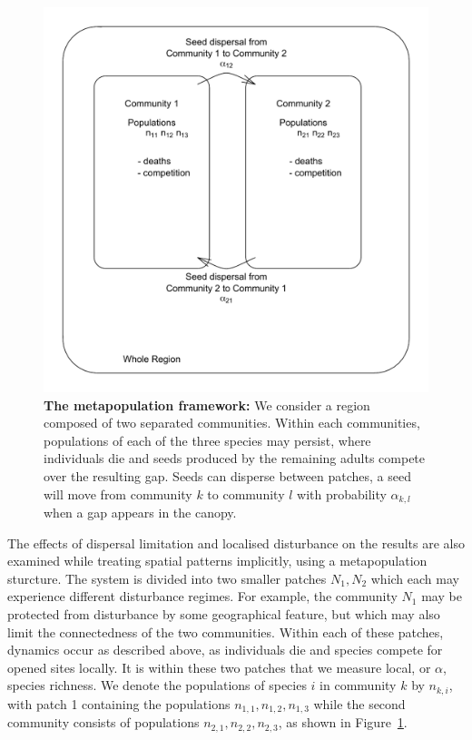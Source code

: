 \begin{figure}[htbp]
\begin{center}
\includegraphics[width=4.5in]{schematic.pdf}
\caption[The metapopulation framework]{\textbf{The metapopulation framework:} We consider a region composed of two separated communities. Within each communities, populations of each of the three species may persist, where individuals die and seeds produced by the remaining adults compete over the resulting gap. Seeds can disperse between patches, a seed will move from community $k$ to community $l$ with probability $\alpha_{k,l}$ when a gap appears in the canopy.}
\label{fig:schematic}
\end{center}
\end{figure}

The effects of dispersal limitation and localised disturbance on the results are also examined while treating spatial patterns implicitly, using a metapopulation sturcture. The system is divided into two smaller patches $N_1,N_2$ which each may experience different disturbance regimes. For example, the community $N_1$ may be protected from disturbance by some geographical feature, but which may also limit the connectedness of the two communities. Within each of these patches, dynamics occur as described above, as individuals die and species compete for opened sites locally. It is within these two patches that we measure local, or $\alpha$, species richness. We denote the populations of species $i$ in community $k$ by $n_{k,i}$, with patch 1 containing the populations $n_{1,1}, n_{1,2}, n_{1,3}$ while the second community consists of populations $n_{2,1}, n_{2,2}, n_{2,3}$, as shown in Figure~\ref{fig:schematic}.

